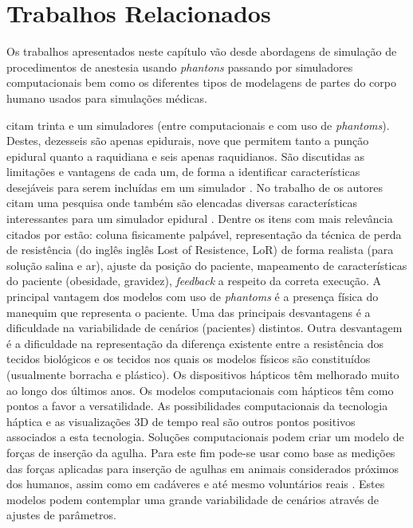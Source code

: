 \chapter{Trabalhos Relacionados} \label{cap:cap3}


Os trabalhos apresentados neste capítulo vão desde abordagens de simulação de procedimentos de anestesia usando \textit{phantons} passando por simuladores computacionais bem como os diferentes tipos de modelagens de partes do corpo humano usados para simulações médicas.  

\textcite{Vaughan2013} citam trinta e um simuladores (entre computacionais e com uso de \textit{phantoms}). Destes, dezesseis são apenas epidurais, nove que permitem tanto a punção epidural quanto a raquidiana e seis apenas raquidianos. São discutidas as limitações e vantagens de cada um, de forma a identificar características desejáveis para serem incluídas em um simulador \cite{Vaughan2013}. No trabalho de \textcite{Isaacs2015} os autores citam uma pesquisa onde também são elencadas diversas características interessantes para um simulador epidural \cite{Isaacs2015}. Dentre os itens com mais relevância citados por \textcite{Isaacs2015} estão: coluna fisicamente palpável, representação da técnica de perda de resistência (do inglês inglês Lost of Resistence, \acrshort{LoR}) de forma realista (para solução salina e ar), ajuste da posição do paciente, mapeamento de características do paciente (obesidade, gravidez), \textit{feedback} a respeito da correta execução.
A principal vantagem dos modelos com uso de \textit{phantoms} é a presença física do manequim que representa o paciente. Uma das principais desvantagens é a dificuldade na variabilidade de cenários (pacientes) distintos. Outra desvantagem é a dificuldade na representação da diferença existente entre a resistência dos tecidos biológicos e os tecidos nos quais os modelos físicos são constituídos (usualmente borracha e plástico).
Os dispositivos hápticos têm melhorado muito ao longo dos últimos anos. Os modelos computacionais com hápticos têm como pontos a favor a versatilidade. As possibilidades computacionais da tecnologia háptica e as visualizações 3D de tempo real são outros pontos positivos associados a esta tecnologia. 
Soluções computacionais podem criar um modelo de forças de inserção da agulha. Para este fim pode-se usar como base as medições das forças aplicadas para inserção de agulhas em animais considerados próximos dos humanos, assim como em cadáveres e até mesmo voluntários reais \cite{Hiemenz1998, Holton2001,Langton1990,McKay2010,Naemura2009,Tran2009,Vaughan2012}. Estes modelos podem contemplar uma grande variabilidade de cenários através de ajustes de parâmetros. 

